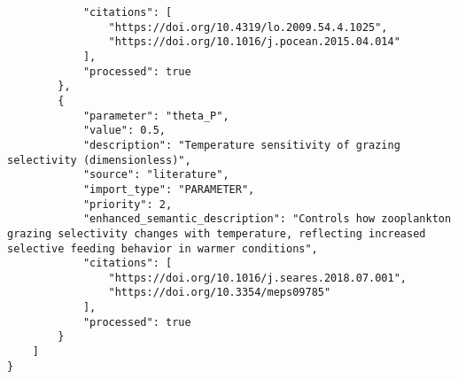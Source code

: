 \begin{lstlisting}
            "citations": [
                "https://doi.org/10.4319/lo.2009.54.4.1025",
                "https://doi.org/10.1016/j.pocean.2015.04.014"
            ],
            "processed": true
        },
        {
            "parameter": "theta_P",
            "value": 0.5,
            "description": "Temperature sensitivity of grazing selectivity (dimensionless)",
            "source": "literature",
            "import_type": "PARAMETER",
            "priority": 2,
            "enhanced_semantic_description": "Controls how zooplankton grazing selectivity changes with temperature, reflecting increased selective feeding behavior in warmer conditions",
            "citations": [
                "https://doi.org/10.1016/j.seares.2018.07.001",
                "https://doi.org/10.3354/meps09785"
            ],
            "processed": true
        }
    ]
}
\end{lstlisting}
\clearpage
